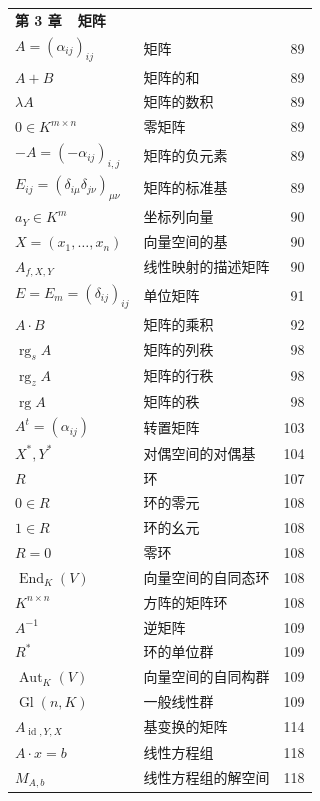 \begin{longtable}{@{}l l r}
\multicolumn{3}{l}{\textbf{第 3 章\ \ 矩阵}} \\[2pt]
$A = (\alpha_{ij})_{ij}$ & 矩阵 & 89 \\
$A + B$ & 矩阵的和 & 89 \\
$\lambda A$ & 矩阵的数积 & 89 \\
$0 \in K^{m \times n}$ & 零矩阵 & 89 \\
$-A = (-\alpha_{ij})_{i,j}$ & 矩阵的负元素 & 89 \\
$E_{ij} = (\delta_{i\mu}\delta_{j\nu})_{\mu\nu}$ & 矩阵的标准基 & 89 \\
$a_Y \in K^m$ & 坐标列向量 & 90 \\
$X = (x_1, \ldots, x_n)$ & 向量空间的基 & 90 \\
$A_{f,X,Y}$ & 线性映射的描述矩阵 & 90 \\
$E = E_m = (\delta_{ij})_{ij}$ & 单位矩阵 & 91 \\
$A \cdot B$ & 矩阵的乘积 & 92 \\
$\operatorname{rg}_s A$ & 矩阵的列秩 & 98 \\
$\operatorname{rg}_z A$ & 矩阵的行秩 & 98 \\
$\operatorname{rg} A$ & 矩阵的秩 & 98 \\
$A^t = (\alpha_{ij})$ & 转置矩阵 & 103 \\
$X^*, Y^*$ & 对偶空间的对偶基 & 104 \\
$R$ & 环 & 107 \\
$0 \in R$ & 环的零元 & 108 \\
$1 \in R$ & 环的幺元 & 108 \\
$R = 0$ & 零环 & 108 \\
$\operatorname{End}_K(V)$ & 向量空间的自同态环 & 108 \\
$K^{n \times n}$ & 方阵的矩阵环 & 108 \\
$A^{-1}$ & 逆矩阵 & 109 \\
$R^*$ & 环的单位群 & 109 \\
$\operatorname{Aut}_K(V)$ & 向量空间的自同构群 & 109 \\
$\operatorname{Gl}(n, K)$ & 一般线性群 & 109 \\
$A_{\operatorname{id},Y,X}$ & 基变换的矩阵 & 114 \\
$A \cdot x = b$ & 线性方程组 & 118 \\
$M_{A,b}$ & 线性方程组的解空间 & 118 \\
\hline


\end{longtable}
